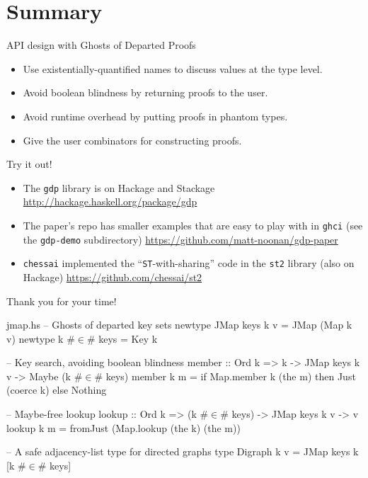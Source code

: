 \documentclass{beamer}
\begin{document}
  \section{Summary}   %
\begin{frame}{API design with Ghosts of Departed Proofs}
  \begin{itemize}
  \item{Use \alert{existentially-quantified names} to discuss values at the type level.}
  \bigskip
  \item{Avoid boolean blindness by \alert{returning proofs to the user}.}
  \bigskip
  \item{Avoid runtime overhead by putting \alert{proofs in phantom types}.}
  \bigskip
  \item{Give the user \alert{combinators for constructing proofs}.}
  \end{itemize}

\end{frame}


\begin{frame}{Try it out!}
  \begin{itemize}
  \item{The \texttt{gdp} library is on Hackage and Stackage
    \url{http://hackage.haskell.org/package/gdp}\medskip
  }
  \item{The paper's repo has smaller examples that are easy to play with
    in \texttt{ghci} (see the \texttt{gdp-demo} subdirectory)
    \url{https://github.com/matt-noonan/gdp-paper}\medskip}
  \item{\texttt{chessai} implemented the ``\texttt{ST}-with-sharing'' code
    in the \texttt{st2} library (also on Hackage) \url{https://github.com/chessai/st2}}
  \end{itemize}
  \medskip
  \Large{Thank you for your time!}
\end{frame}

\begin{filecontents*}{jmap.hs}
-- Ghosts of departed key sets
newtype JMap keys k v = JMap (Map k v)
newtype k #$\in$# keys      = Key k

-- Key search, avoiding boolean blindness
member :: Ord k => k -> JMap keys k v -> Maybe (k #$\in$# keys)
member k m = if Map.member k (the m)
               then Just (coerce k)
               else Nothing
               
-- Maybe-free lookup
lookup :: Ord k => (k #$\in$# keys) -> JMap keys k v -> v
lookup k m = fromJust (Map.lookup (the k) (the m))

-- A safe adjacency-list type for directed graphs
type Digraph k v = JMap keys k [k #$\in$# keys]
\end{filecontents*}
\end{document}
